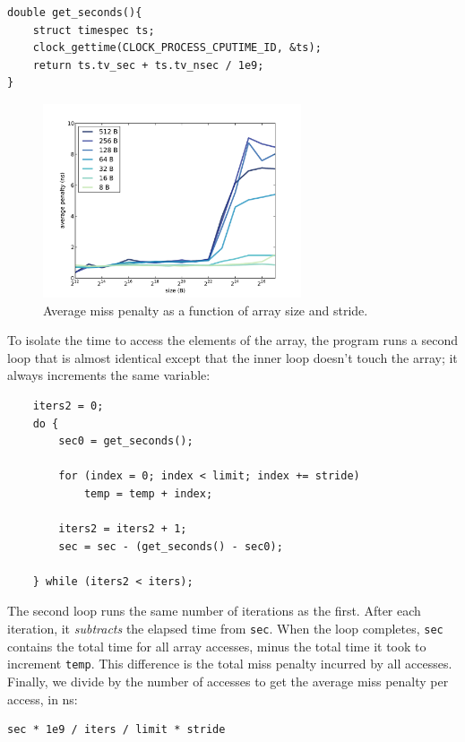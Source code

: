 \documentclass[12pt]{book}
\begin{document}
{\begin{verbatim}
double get_seconds(){
    struct timespec ts;
    clock_gettime(CLOCK_PROCESS_CPUTIME_ID, &ts);
    return ts.tv_sec + ts.tv_nsec / 1e9;
}
\end{verbatim}

\begin{figure}
\centerline{\includegraphics[width=3in]{figs/cache_data.pdf}}
\caption{Average miss penalty as a function of array size and stride.}
\label{cachedata}
\end{figure}

To isolate the time to access the elements of the array,
the program runs a second loop that is almost identical except
that the inner loop doesn't touch the array; it always increments
the same variable:

\begin{verbatim}
    iters2 = 0;
    do {
        sec0 = get_seconds();
        
        for (index = 0; index < limit; index += stride) 
            temp = temp + index;
        
        iters2 = iters2 + 1;
        sec = sec - (get_seconds() - sec0);

    } while (iters2 < iters);
\end{verbatim}

The second loop runs the same number of iterations as the first.
After each iteration, it {\em subtracts} the elapsed time from
{\tt sec}.  When the loop completes, {\tt sec} contains the total
time for all array accesses, minus the total time it took to increment
{\tt temp}.  This difference is the total miss penalty incurred by
all accesses.  Finally, we divide by the number of accesses to
get the average miss penalty per access, in ns:

\begin{verbatim}
sec * 1e9 / iters / limit * stride
\end{verbatim}

}
\end{document}

